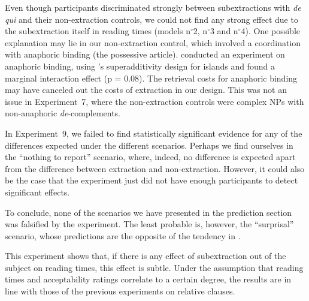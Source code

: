 Even though participants discriminated strongly between subextractions with \emph{de qui} and their non-extraction controls, we could not find any strong effect due to the subextraction itself in reading times (models n$^{\circ}$2, n$^{\circ}$3 and n$^{\circ}$4). One possible explanation may lie in our non-extraction control, which involved a coordination with anaphoric binding (the possessive article). \citet[641]{Keshev.2019} conducted an experiment on anaphoric binding, using \citeauthor{Sprouse.2016}'s superadditivity design for islands and found a marginal interaction effect (p = 0.08).
The retrieval costs for anaphoric binding may have canceled out the costs of extraction in our design. This was not an issue in Experiment~7, where the non-extraction controls were complex NPs with non-anaphoric \emph{de}-complements.

In Experiment~9, we failed to find statistically significant evidence for any of the differences expected under the different scenarios. Perhaps we find ourselves in the ``nothing to report'' scenario, where, indeed, no difference is expected apart from the difference between extraction and non-extraction. However, it could also be the case that the experiment just did not have enough participants to detect significant effects. %

\pagebreak
To conclude, none of the scenarios we have presented in the prediction section was falsified by the experiment. The least probable is, however, the ``surprisal'' scenario, whose predictions are the opposite of the tendency in .

This experiment shows that, if there is any effect of subextraction out of the subject on reading times, this effect is subtle. Under the assumption that reading times and acceptability ratings correlate to a certain degree, the results are in line with those of the previous experiments on relative clauses.
